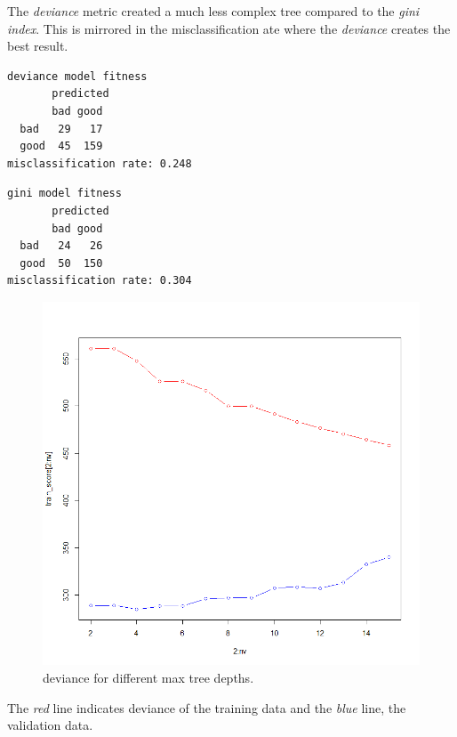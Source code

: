 \documentclass[a4paper,12pt]{article}
\begin{document}
The \textit{deviance} metric created a much less complex tree compared to the \textit{gini index}. This is mirrored in the misclassification ate where the \textit{deviance} creates the best result.

\begin{minipage}[]{0.49\textwidth}
 \begin{verbatim}
deviance model fitness
       predicted
       bad good
  bad   29   17
  good  45  159
misclassification rate: 0.248
\end{verbatim}
 \end{minipage}
 \begin{minipage}[]{0.49\textwidth}
\begin{verbatim}
gini model fitness
       predicted
       bad good
  bad   24   26
  good  50  150
misclassification rate: 0.304
\end{verbatim}
 \end{minipage}

\begin{figure}[H]
\centering
\begin{minipage}[]{0.5\textwidth}
  \includegraphics[width=\textwidth]{figures/tree_depth.png}  
  \caption{deviance for different max tree depths.\label{fig:logit_plot}}
 \end{minipage}
\end{figure}
The \textit{red} line indicates deviance of the training data and the \textit{blue} line, the validation data.
\end{document}
